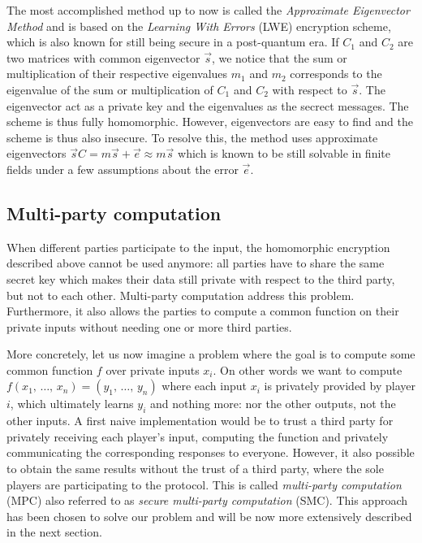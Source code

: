 The most accomplished method up to now is called the \emph{Approximate Eigenvector Method} and is based on the \emph{Learning With Errors} (LWE) encryption scheme, which is also known for still being secure in a post-quantum era. If $C_1$ and $C_2$ are two matrices with common eigenvector $\vec{s}$, we notice that the sum or multiplication of their respective eigenvalues $m_1$ and $m_2$ corresponds to the eigenvalue of the sum or multiplication of $C_1$ and $C_2$ with respect to $\vec{s}$. The eigenvector act as a private key and the eigenvalues as the secrect messages. The scheme is thus fully homomorphic. However, eigenvectors are easy to find and the scheme is thus also insecure. To resolve this, the method uses approximate eigenvectors $\vec{s}C=m\vec{s}+\vec{e}\approx m\vec{s}$ which is known to be still solvable in finite fields under a few assumptions about the error $\vec{e}$.

\subsection{Multi-party computation}
When different parties participate to the input, the homomorphic encryption described above cannot be used anymore: all parties have to share the same secret key which makes their data still private with respect to the third party, but not to each other. Multi-party computation address this problem. Furthermore, it also allows the parties to compute a common function on their private inputs without needing one or more third parties. 

More concretely, let us now imagine a problem where the goal is to compute some common function $f$ over private inputs $x_i$. On other words we want to compute $f\left(x_1, \, \ldots, \, x_n\right) = \left( y_1, \, \ldots , \, y_n\right)$ where each input $x_i$ is privately provided by player $i$, which ultimately learns $y_i$ and nothing more: nor the other outputs, not the other inputs. A first naive implementation would be to trust a third party for privately receiving each player's input, computing the function and privately communicating the corresponding responses to everyone. However, it also possible to obtain the same results without the trust of a third party, where the sole players are participating to the protocol. This is called \emph{multi-party computation} (MPC) also referred to as \emph{secure multi-party computation} (SMC). This approach has been chosen to solve our problem and will be now more extensively described in the next section.

